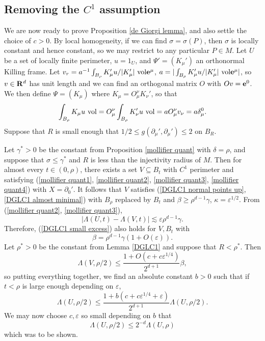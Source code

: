 
\subsection{Removing the \texorpdfstring{$C^1$}{C1} assumption}\label{proof of DGL}
We are now ready to prove Proposition \ref{de Giorgi lemma}, and also settle the choice of $c > 0$.
By local homogeneity, if we can find $\sigma = \sigma(P)$, then $\sigma$ is locally constant and hence constant, so we may restrict to any particular $P \in M$.
Let $U$ be a set of locally finite perimeter, $u = 1_U$, and $\Psi' = (K_\mu')$ an orthonormal Killing frame.
Let $v_r = a^{-1}\int_{B_\rho} K_\mu' u/|K_\mu'| ~\mathrm{vol} \mathbf e^\mu$, $a = |\int_{B_\rho} K_\mu' u/|K_\mu'| ~\mathrm{vol} \mathbf e^\mu|$, so $v \in \mathbf{R}^d$ has unit length and we can find an orthogonal matrix $O$ with $Ov = \mathbf e^0$.
We then define $\Psi = (K_\mu)$ where $K_\mu = O^\nu_\mu K_\nu'$, so that
$$\int_{B_\rho} K_\mu u ~\mathrm{vol} = O^\nu_\mu \int_{B_\rho} K_\nu' u ~\mathrm{vol} = aO^\nu_\mu v_\nu = a\delta_\mu^0.$$
Suppose that $R$ is small enough that $1/2 \leq g(\partial_\mu', \partial_\mu') \leq 2$ on $B_R$.

Let $\gamma^* > 0$ be the constant from Proposition \ref{mollifier quant} with $\delta = \rho$, and suppose that $\sigma \leq \gamma^*$ and $R$ is less than the injectivity radius of $M$.
Then for almost every $t \in (0, \rho)$, there exists a set $V \subseteq B_t$ with $C^1$ perimeter and satisfying (\ref{mollifier quant1}, \ref{mollifier quant2}, \ref{mollifier quant3}, \ref{mollifier quant4}) with $X = \partial_0'$.
It follows that $V$ satisfies (\ref{DGLC1 normal points up}, \ref{DGLC1 almost minimal}) with $B_\rho$ replaced by $B_t$ and $\beta \geq \rho^{d - 1} \gamma$, $\kappa = \varepsilon^{1/2}$.
From (\ref{mollifier quant2}, \ref{mollifier quant3}),
$$|\Lambda(U, t) - \Lambda(V, t)| \lesssim \varepsilon \rho^{d - 1} \gamma.$$
Therefore, (\ref{DGLC1 small excess}) also holds for $V, B_t$ with
$$\beta = \rho^{d - 1} \gamma(1 + O(\varepsilon)).$$
Let $\rho^* > 0$ be the constant from Lemma \ref{DGLC1} and suppose that $R < \rho^*$.
Then
$$\Lambda(V, \rho/2) \leq \frac{1 + O(c + c\varepsilon^{1/4})}{2^{d + 1}} \beta,$$
so putting everything together, we find an absolute constant $b > 0$ such that if $t < \rho$ is large enough depending on $\varepsilon$,
$$\Lambda(U, \rho/2) \leq \frac{1 + b(c + c\varepsilon^{1/4} + \varepsilon)}{2^{d + 1}} \Lambda(U, \rho/2).$$
We may now choose $c, \varepsilon$ so small depending on $b$ that
$$\Lambda(U, \rho/2) \leq 2^{-d} \Lambda(U, \rho)$$
which was to be shown.
